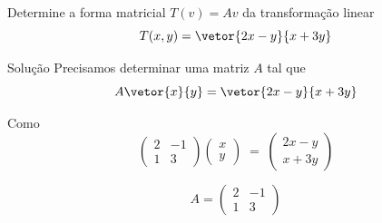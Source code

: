 \begin{question}
  Determine a forma matricial \(T(v)=Av\) da transformação linear
  \[
    T(x, y) = \vetor{2x-y}{x+3y}
  \]
\end{question}

\begin{resolution}{Solução}
  Precisamos determinar uma matriz $A$
  \pause
  tal que
  \[
    A\vetor{x}{y} = \vetor{2x-y}{x+3y}
  \]

  \pause
  Como
  \[
    \begin{pmatrix}
      2 & -1 \\
      1 & 3
    \end{pmatrix}
    \begin{pmatrix}
      x \\
      y
    \end{pmatrix}
    \;=\;
    \begin{pmatrix}
      2x-y \\
      x+3y
    \end{pmatrix}
  \]

  \pause
  \[
    A = \begin{pmatrix}
          2 & -1 \\
          1 & 3
        \end{pmatrix}
  \]
\end{resolution}

\endinput

